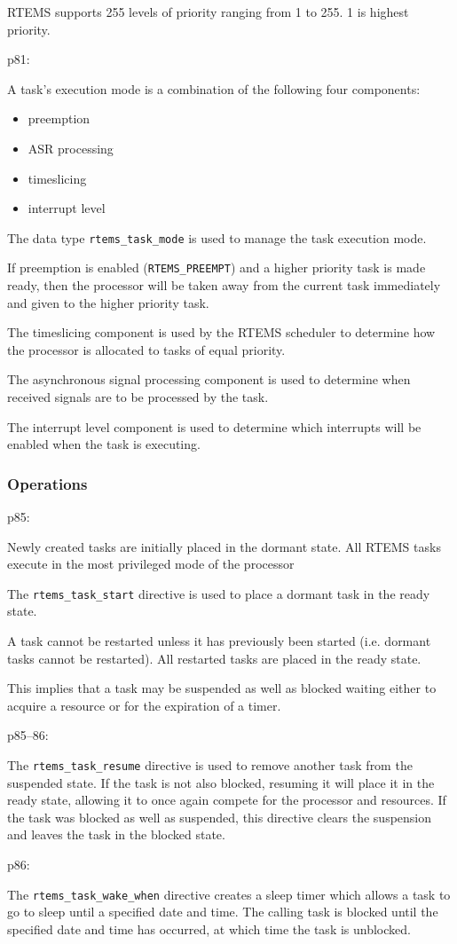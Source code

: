 RTEMS supports 255 levels of priority ranging from 1 to 255.
1 is highest priority.

p81:

A task’s execution mode is a combination of the following four components:
\begin{itemize}
  \item
    preemption
  \item
    ASR processing
  \item
    timeslicing
  \item
    interrupt level
\end{itemize}

The data type \verb"rtems_task_mode" is used to manage the task execution mode.

If preemption is enabled (\verb"RTEMS_PREEMPT")
and a higher priority task is made ready,
then the processor will be taken away from the current task immediately
and given to the higher priority task.

The timeslicing component is used by the RTEMS scheduler to determine how the processor is
allocated to tasks of equal priority.

The asynchronous signal processing component is used
to determine when received signals are to be processed by the task.

The interrupt level component is used to determine
which interrupts will be enabled when the task is executing.

\subsubsection{Operations}

p85:

Newly created tasks are initially placed in the dormant state.
All RTEMS tasks execute in the most privileged mode of the processor

The \verb"rtems_task_start" directive is used
to place a dormant task in the ready state.

A task cannot be restarted unless it has previously been started
(i.e. dormant tasks cannot be restarted).
All restarted tasks are placed in the ready state.

This implies that a task may be suspended as well as blocked waiting
either to acquire a resource or for the expiration of a timer.

p85--86:

The \verb"rtems_task_resume" directive is used to remove another task
from the suspended state.
If the task is not also blocked,
resuming it will place it in the ready state,
allowing it to once again compete for the processor and resources.
If the task was blocked as well as suspended,
this directive clears the suspension and leaves the task in the blocked state.

p86:

The \verb"rtems_task_wake_when" directive creates a sleep timer
which allows a task to go to sleep until a specified date and time.
The calling task is blocked until the specified date and time has occurred,
at which time the task is unblocked.
